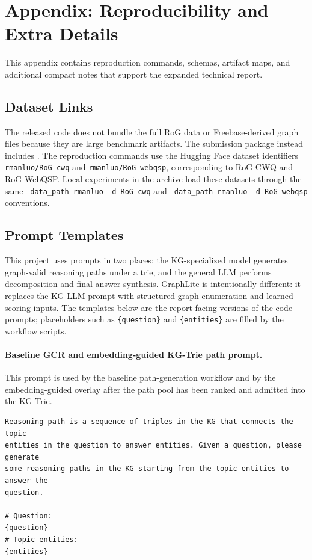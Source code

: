 \documentclass[10pt,twocolumn]{article}
\newcommand{\code}[1]{\texttt{#1}}
\begin{document}
\appendix

\section{Appendix: Reproducibility and Extra Details}
\small
This appendix contains reproduction commands, schemas, artifact maps, and additional compact notes that support the expanded technical report.



\subsection{Dataset Links}
The released code does not bundle the full RoG data or Freebase-derived graph files because they are large benchmark artifacts. The submission package instead includes . The reproduction commands use the Hugging Face dataset identifiers \code{rmanluo/RoG-cwq} and \code{rmanluo/RoG-webqsp}, corresponding to \href{https://huggingface.co/datasets/rmanluo/RoG-cwq}{RoG-CWQ} and \href{https://huggingface.co/datasets/rmanluo/RoG-webqsp}{RoG-WebQSP}. Local experiments in the archive load these datasets through the same \code{--data\_path rmanluo --d RoG-cwq} and \code{--data\_path rmanluo --d RoG-webqsp} conventions.

\subsection{Prompt Templates}
This project uses prompts in two places: the KG-specialized model generates graph-valid reasoning paths under a trie, and the general LLM performs decomposition and final answer synthesis. GraphLite is intentionally different: it replaces the KG-LLM prompt with structured graph enumeration and learned scoring inputs. The templates below are the report-facing versions of the code prompts; placeholders such as \code{\{question\}} and \code{\{entities\}} are filled by the workflow scripts.

\paragraph{Baseline GCR and embedding-guided KG-Trie path prompt.}
This prompt is used by the baseline path-generation workflow and by the embedding-guided overlay after the path pool has been ranked and admitted into the KG-Trie.
\begin{verbatim}
Reasoning path is a sequence of triples in the KG that connects the topic
entities in the question to answer entities. Given a question, please generate
some reasoning paths in the KG starting from the topic entities to answer the
question.

# Question:
{question}
# Topic entities:
{entities}
\end{verbatim}
\end{document}
